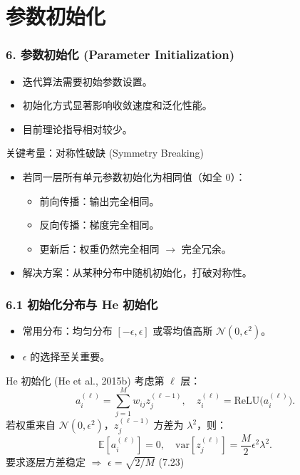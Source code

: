\documentclass[t,aspectratio=169]{beamer} %
\begin{document}
\section{参数初始化}

\begin{frame}
    \frametitle{6. 参数初始化 (Parameter Initialization)}
    \begin{itemize}
        \item 迭代算法需要\alert{初始参数设置}。
        \item 初始化方式显著影响\alert{收敛速度}和\alert{泛化性能}。
        \item 目前理论指导相对较少。
    \end{itemize}
    \begin{block}{关键考量：对称性破缺 (Symmetry Breaking)}
        \begin{itemize}
            \item 若同一层所有单元参数\alert{初始化为相同值}（如全 0）：
            \begin{itemize}
                \item 前向传播：输出完全相同。
                \item 反向传播：梯度完全相同。
                \item 更新后：权重仍然完全相同 $\rightarrow$ \alert{完全冗余}。
            \end{itemize}
            \item 解决方案：从某种分布中\alert{随机初始化}，打破对称性。
        \end{itemize}
    \end{block}
\end{frame}

\begin{frame}
    \frametitle{6.1 初始化分布与 He 初始化}
    \begin{itemize}
        \item 常用分布：均匀分布 $[-\epsilon,\epsilon]$ 或零均值高斯 $\mathcal{N}(0,\epsilon^2)$。
        \item $\epsilon$ 的选择至关重要。
    \end{itemize}
    \begin{block}{He 初始化 (He et al., 2015b)}
        考虑第 $\ell$ 层：
        $$
        a_i^{(\ell)} = \sum_{j=1}^{M} w_{ij} z_j^{(\ell-1)}, \quad %
        z_i^{(\ell)} = \mathrm{ReLU}\bigl(a_i^{(\ell)}\bigr). %
        $$
        若权重来自 $\mathcal{N}(0,\epsilon^2)$，$z_j^{(\ell-1)}$ 方差为 $\lambda^2$，则：
        $$
        \mathbb{E}[a_i^{(\ell)}] = 0, \quad %
        \mathrm{var}[z_j^{(\ell)}] = \frac{M}{2} \epsilon^2 \lambda^2. %
        $$
        要求逐层方差稳定 $\Rightarrow$ \alert{$\epsilon = \sqrt{2/M}$} (7.23)
    \end{block}
\end{frame}
\end{document}
